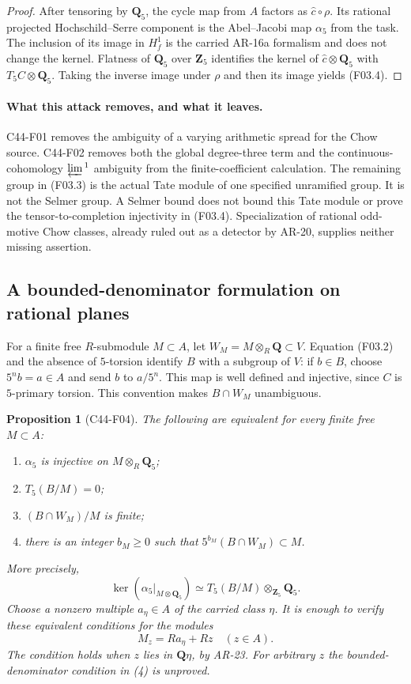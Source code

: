 \documentclass[11pt]{article}
\newtheorem{proposition}[theorem]{Proposition}
\theoremstyle{remark}\newtheorem{remark}[theorem]{Remark}
\begin{document}
\begin{proof}
After tensoring by $\mathbf Q_5$, the cycle map from $A$
factors as $\widehat c\circ\rho$.  Its rational projected
Hochschild--Serre component is the Abel--Jacobi map
$\alpha_5$ from the task.  The inclusion of its image in
$H^1_f$ is the carried AR-16a formalism and does not change
the kernel.  Flatness of $\mathbf Q_5$ over $\mathbf Z_5$
identifies the kernel of $\widehat c\otimes\mathbf Q_5$ with
$T_5C\otimes\mathbf Q_5$.  Taking the inverse image under
$\rho$ and then its image yields (F03.4).
\end{proof}

\paragraph{What this attack removes, and what it leaves.}
C44-F01 removes the ambiguity of a varying arithmetic spread for
the Chow source.  C44-F02 removes both the global degree-three
term and the continuous-cohomology $\varprojlim{}^1$ ambiguity
from the finite-coefficient calculation.  The remaining group
in (F03.3) is the actual Tate module of one specified unramified
group.  It is not the Selmer group.  A Selmer bound does not bound
this Tate module or prove the tensor-to-completion injectivity in
(F03.4).  Specialization of rational odd-motive Chow classes,
already ruled out as a detector by AR-20, supplies neither
missing assertion.

\subsection{A bounded-denominator formulation on rational planes}

For a finite free $R$-submodule $M\subset A$, let
$W_M=M\otimes_R\mathbf Q\subset V$.  Equation (F03.2) and
the absence of $5$-torsion identify $B$ with a subgroup of $V$:
if $b\in B$, choose $5^n b=a\in A$ and send $b$ to $a/5^n$.
This map is well defined and injective, since $C$ is $5$-primary
torsion.  This convention makes $B\cap W_M$ unambiguous.

\begin{proposition}[C44-F04]\label{C44-F04}
The following are equivalent for every finite free $M\subset A$:
\begin{enumerate}
\item $\alpha_5$ is injective on $M\otimes_R\mathbf Q_5$;
\item $T_5(B/M)=0$;
\item $(B\cap W_M)/M$ is finite;
\item there is an integer $b_M\ge0$ such that
      $5^{b_M}(B\cap W_M)\subset M$.
\end{enumerate}
More precisely,
\[
 \ker(\alpha_5|_{M\otimes\mathbf Q_5})
       \simeq T_5(B/M)\otimes_{\mathbf Z_5}\mathbf Q_5.
 \tag{F04.1}
\]
Choose a nonzero multiple $a_\eta\in A$ of the carried class
$\eta$.  It is enough to verify these equivalent conditions for
the modules
\[
                  M_z=R a_\eta+Rz\quad(z\in A).
 \tag{F04.2}
\]
The condition holds when $z$ lies in $\mathbf Q\eta$, by AR-23.
For arbitrary $z$ the bounded-denominator condition in (4) is
unproved.
\end{proposition}
\end{document}
